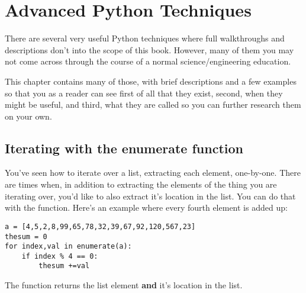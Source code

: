 \chapter{Advanced Python Techniques}
There are several very useful Python techniques where full walkthroughs and descriptions don't into the scope of this book.  However, many of them you may not come across through the course of a normal science/engineering education.

This chapter contains many of those, with brief descriptions and a few examples so that you as a reader can see first of all that they exist, second, when they might be useful, and third, what they are called so you can further research them on your own.

\section{Iterating with the enumerate function}
You've seen how to iterate over a list, extracting each element,
one-by-one.  There are times when, in addition to extracting the
elements of the thing you are iterating over, you'd like to also
extract it's location in the list.  You can do that with the
 function.  Here's an example where every fourth
element is added up:  
\begin{Verbatim}
a = [4,5,2,8,99,65,78,32,39,67,92,120,567,23]
thesum = 0
for index,val in enumerate(a):
    if index % 4 == 0:
        thesum +=val
\end{Verbatim}
The function  returns the list element \textbf{and}
it's location in the list.
